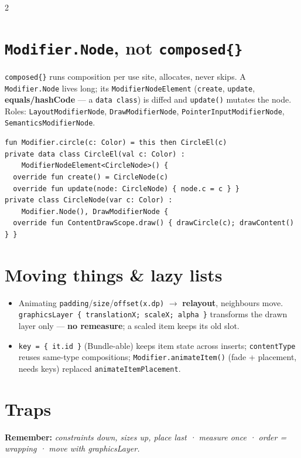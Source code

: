 \documentclass[8pt]{extarticle}
\begin{document}
\begin{multicols}{2}
\section{\texttt{Modifier.Node}, not \texttt{composed\{\}}}
\raggedright \texttt{composed\{\}} runs composition per use site, allocates, never skips. A
\texttt{Modifier.Node} lives long; its \texttt{ModifierNodeElement} (\texttt{create},
\texttt{update}, \textbf{equals/hashCode} — a \texttt{data class}) is diffed and
\texttt{update()} mutates the node. Roles: \texttt{LayoutModifierNode},
\texttt{DrawModifierNode}, \texttt{PointerInputModifierNode}, \texttt{SemanticsModifierNode}.
\begin{lstlisting}[language=KotlinSheet]
fun Modifier.circle(c: Color) = this then CircleEl(c)
private data class CircleEl(val c: Color) :
    ModifierNodeElement<CircleNode>() {
  override fun create() = CircleNode(c)
  override fun update(node: CircleNode) { node.c = c } }
private class CircleNode(var c: Color) :
    Modifier.Node(), DrawModifierNode {
  override fun ContentDrawScope.draw() { drawCircle(c); drawContent() } }
\end{lstlisting}

\section{Moving things \& lazy lists}
\begin{itemize}\raggedright
  \item Animating \texttt{padding}/\texttt{size}/\texttt{offset(x.dp)} $\to$ \textbf{relayout},
        neighbours move. \texttt{graphicsLayer \{ translationX; scaleX; alpha \}} transforms
        the drawn layer only — \textbf{no remeasure}; a scaled item keeps its old slot.
  \item \texttt{key = \{ it.id \}} (Bundle-able) keeps item state across inserts;
        \texttt{contentType} reuses same-type compositions; \texttt{Modifier.animateItem()}
        (fade + placement, needs keys) replaced \texttt{animateItemPlacement}.
\end{itemize}

\section{Traps}
\begin{itemize}\raggedright
\end{itemize}

\textbf{Remember:} \emph{constraints down, sizes up, place last · measure once · order =
wrapping · move with graphicsLayer.}


\end{multicols}

\end{document}
